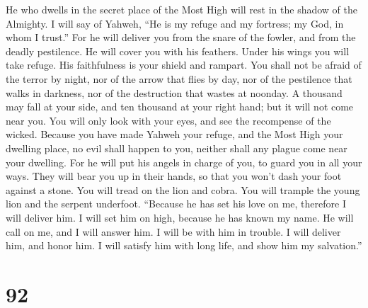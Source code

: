  He who dwells in the secret place of the Most High will
rest in the shadow of the Almighty.  I will say of Yahweh,
``He is my refuge and my fortress; my God, in whom I trust.''
 For he will deliver you from the snare of the fowler, and
from the deadly pestilence.  He will cover you with his
feathers. Under his wings you will take refuge. His faithfulness is your
shield and rampart.  You shall not be afraid of the terror
by night, nor of the arrow that flies by day,  nor of the
pestilence that walks in darkness, nor of the destruction that wastes at
noonday.  A thousand may fall at your side, and ten
thousand at your right hand; but it will not come near you.
 You will only look with your eyes, and see the recompense
of the wicked.  Because you have made Yahweh your refuge,
and the Most High your dwelling place,  no evil shall
happen to you, neither shall any plague come near your dwelling.
 For he will put his angels in charge of you, to guard
you in all your ways.  They will bear you up in their
hands, so that you won't dash your foot against a stone. 
You will tread on the lion and cobra. You will trample the young lion
and the serpent underfoot.  ``Because he has set his love
on me, therefore I will deliver him. I will set him on high, because he
has known my name.  He will call on me, and I will answer
him. I will be with him in trouble. I will deliver him, and honor him.
 I will satisfy him with long life, and show him my
salvation.''

\hypertarget{section-91}{%
\section{92}\label{section-91}}

